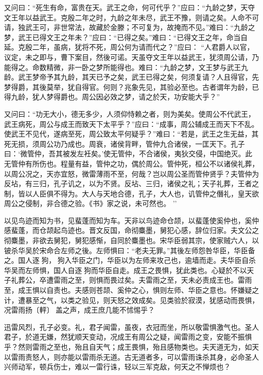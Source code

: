 \documentclass[]{article}
\begin{document}
又问曰：``死生有命，富贵在天。武王之命，何可代乎？''应曰：``九龄之梦，天夺文王年以益武王。克殷二年之时，九龄之年未尽，武王不豫，则请之矣。人命不可请，独武王可，非世常法，故藏於金滕；不可复为，故掩而不见。''难曰：``九龄之梦，武王已得文王之年未？''应曰：``已得之矣。''难曰：``已得文王之年，命当自延。克殷二年，虽病，犹将不死，周公何为请而代之？''应曰：
``人君爵人以官，议定，未之即与，曹下案目，然後可诺。天虽夺文王年以益武王，犹须周公请，乃能得之。命数精微，非一卧之梦所能得也。难曰：``九龄之梦，文王梦与武王九龄。武王梦帝予其九龄，其天已予之矣，武王已得之矣，何须复请？人且得官，先梦得爵，其後莫举，犹自得官。何则？兆象先见，其验必至也。古者谓年为龄，已得九龄，犹人梦得爵也。周公因必效之梦，请之於天，功安能大乎？''

又问曰：``功无大小，德无多少，人须仰恃赖之者，则为美矣。使周公不代武王，武王病死，周公与成王而致天下太平乎？''应曰：``成事，周公辅成王而天下不乱。使武王不见代，遂病至死，周公致太平何疑乎？''难曰：``若是，武王之生无益，其死无损，须周公功乃成也。周衰，诸侯背畔，管仲九合诸侯，一匡天下。孔子曰：`微管仲，吾其被发左衽矣。'使无管仲，不合诸侯，夷狄交侵，中国绝灭。此无管仲有所伤也。程量有益，管仲之功，偶於周公。管仲死，桓公不以诸侯礼葬，以周公况之，天亦宜怒，微雷薄雨不至，何哉？岂以周公圣而管仲贤乎？夫管仲为反坫，有三归，孔子讥之，以为不贤。反坫、三归，诸侯之礼；天子礼葬，王者之制，皆以人臣俱不得为。大人与天地合德，孔子，大人也，讥管仲之僭礼，皇天欲周公之侵制，非合德之验。《书》家之说，未可然也。
''

以见鸟迹而知为书，见蜚蓬而知为车。天非以鸟迹命仓颉，以蜚蓬使奚仲也，奚仲感蜚蓬，而仓颉起鸟迹也。晋文反国，命彻麋墨，舅犯心感，辞位归家。夫文公之彻麋墨，非欲去舅犯，舅犯感惭，自同於麋墨也。宋华臣弱其宗，使家贼六人，以铍杀华吴於宋命合左师之後。左师惧曰：``老夫无罪。''其後左师怨咎华臣，华臣备之。国人逐狗，狗入华臣之门，华臣以为左师来攻己也，逾墙而走。夫华臣自杀华吴而左师惧，国人自逐狗而华臣自走。成王之畏惧，犹此类也。心疑於不以天子礼葬公，卒遭雷雨之至，则惧而畏过矣。夫雷雨之至，天未必责成王也。雷雨至，成王惧以自责也。夫感则苍颉、奚仲之心，惧则左师、华臣之意也。怀嫌疑之计，遭暴至之气，以类之验见，则天怒之效成矣。见类验於寂漠，犹感动而畏惧，况雷雨扬〔軯〕盖之声，成王庶几能不怵惕乎？

迅雷风烈，孔子必变。礼，君子闻雷，虽夜，衣冠而坐，所以敬雷惧激气也。圣人君子，於道无嫌，然犹顺天变动，况成王有周公之疑，闻雷雨之变，安能不振惧乎？然则雷雨之至也，殆且自天气；成王畏惧，殆且感物类也。夫天道无为，如天以雷雨责怒人，则亦能以雷雨杀无道。古无道者多，可以雷雨诛杀其身，必命圣人兴师动军，顿兵伤士，难以一雷行诛，轻以三军克敌，何天之不惮烦也？
\end{document}
